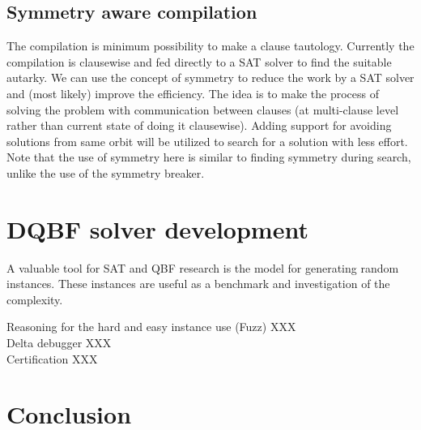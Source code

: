\documentclass[conference]{IEEEtran}
\begin{document}

\subsection{Symmetry aware compilation}
The compilation is minimum possibility to make a clause tautology. 
%
Currently the compilation is clausewise and fed directly to a SAT solver to find the suitable autarky.
%
We can use the concept of symmetry to reduce the work by a SAT solver and (most likely) improve the efficiency.
%
The idea is to make the process of solving the problem with communication between clauses (at multi-clause level rather than current state of doing it clausewise).
%
Adding support for avoiding solutions from same orbit will be utilized to search for a solution with less effort.
%
Note that the use of symmetry here is similar to finding symmetry during search, unlike the use of the symmetry breaker. 
 

\section{DQBF solver development}
\label{sec:dev}

A valuable tool for SAT and QBF research is the model for
generating random instances. These instances are useful as a benchmark and investigation of the complexity.

Reasoning for the hard and easy instance use (Fuzz) XXX \\

Delta debugger XXX \\

Certification XXX

\section{Conclusion}
\label{sec:conc}
\end{document}
